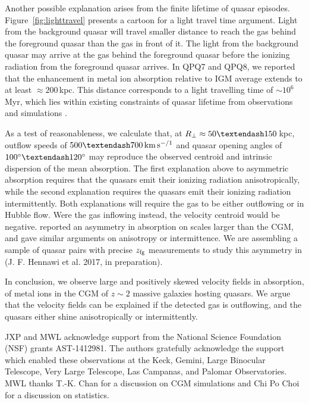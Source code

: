 \documentclass[iop]{emulateapj}
\begin{document}
Another possible explanation arises from the finite lifetime of quasar episodes. 
Figure~\ref{fig:lighttravel} presents a cartoon for a light travel time argument. Light from the 
background quasar will travel smaller distance to reach the gas behind the foreground quasar 
than the gas in front of it. The light from the background quasar may arrive at the gas behind 
the foreground quasar before the ionizing radiation from the foreground quasar arrives. In 
QPQ7 and QPQ8, we reported that the enhancement in metal ion absorption relative to IGM average 
extends to at least $\approx200$\,kpc. This distance corresponds to a light travelling time of 
$\sim10^6$\,Myr, which lies within existing constraints of quasar lifetime from observations 
\citep[e.g.][]{Martini04} and simulations \citep[e.g.][]{Hopkins+05}. 

As a test of reasonableness, we calculate that, at $R_\perp\approx50\textendash150$\,kpc, 
outflow speeds of $500\textendash700\,{\rm km\,s^{-/1}}$ and quasar opening angles of 
$100^\circ\textendash120^\circ$ may reproduce the observed centroid and intrinsic dispersion of 
the  mean absorption. 
The first explanation above to asymmetric absorption requires that the quasars emit their ionizing 
radiation anisotropically, while the second explanation requires the quasars emit their ionizing 
radiation intermittently. Both explanations will require the gas to be either outflowing or in 
Hubble flow. Were the gas inflowing instead, the velocity centroid would be negative. 
\cite{KirkmanTytler08} reported an asymmetry in  absorption on scales larger than 
the CGM, and gave similar arguments on anisotropy or intermittence. We are assembling a sample of 
quasar pairs with precise 
$z_{\rm fg}$ measurements to study this asymmetry in  (J. F. Hennawi et al. 2017, in 
preparation). 

In conclusion, we observe large and positively skewed velocity fields in absorption, of metal ions 
in the CGM of $z\sim2$ massive galaxies hosting quasars. We argue that the velocity fields can be 
explained if the detected gas is outflowing, and the quasars either shine anisotropically or 
intermittently. 

\acknowledgements

JXP and MWL acknowledge support from the National Science Foundation (NSF) grants AST-1412981. The 
authors gratefully acknowledge the support which enabled these observations at the Keck, Gemini, 
Large Binocular Telescope, Very Large Telescope, Las Campanas, and Palomar Observatories. MWL 
thanks T.-K. Chan for a discussion on CGM simulations and Chi Po Choi for a discussion on 
statistics. 



\end{document}
